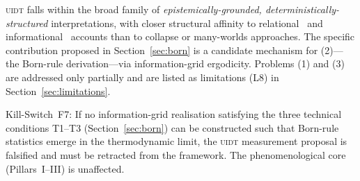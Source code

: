 \textsc{uidt} falls within the broad family of \emph{epistemically-grounded,
deterministically-structured} interpretations, with closer structural
affinity to relational~\cite{Rovelli1996} and informational~\cite{Fuchs2014}
accounts than to collapse or many-worlds approaches. The specific
contribution proposed in Section~\ref{sec:born} is a candidate mechanism
for (2)---the Born-rule derivation---via information-grid ergodicity.
Problems (1) and (3) are addressed only partially and are listed as
limitations (L8) in Section~\ref{sec:limitations}.

\begin{tcolorbox}[killswitch]
  Kill-Switch~F7: If no information-grid realisation satisfying the three
  technical conditions T1--T3 (Section~\ref{sec:born}) can be constructed
  such that Born-rule statistics emerge in the thermodynamic limit, the
  \textsc{uidt} measurement proposal is falsified and must be retracted
  from the framework. The phenomenological core (Pillars~I--III) is
  unaffected.
\end{tcolorbox}
